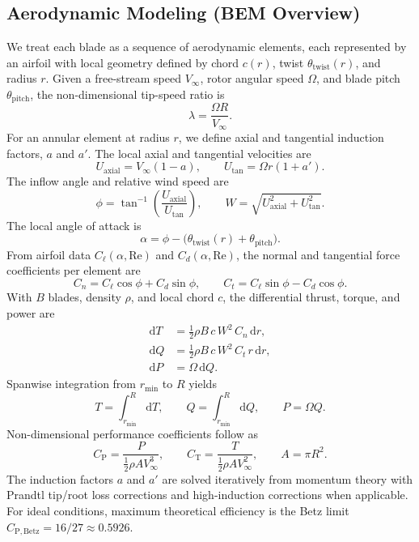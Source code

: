 \documentclass[11pt]{article}
\begin{document}
\subsection{Aerodynamic Modeling (BEM Overview)}
We treat each blade as a sequence of aerodynamic elements, each represented by an airfoil with local geometry defined by chord \(c(r)\), twist \(\theta_\mathrm{twist}(r)\), and radius \(r\). Given a free-stream speed \(V_\infty\), rotor angular speed \(\Omega\), and blade pitch \(\theta_\mathrm{pitch}\), the non-dimensional tip-speed ratio is
\begin{equation}
\lambda = \frac{\Omega R}{V_\infty}.
\label{eq:tsr}
\end{equation}
For an annular element at radius \(r\), we define axial and tangential induction factors, \(a\) and \(a'\). The local axial and tangential velocities are
\begin{equation}
U_\mathrm{axial} = V_\infty (1 - a),\qquad U_\mathrm{tan} = \Omega r (1 + a').
\end{equation}
The inflow angle and relative wind speed are
\begin{equation}
\phi = \tan^{-1}\!\left( \frac{U_\mathrm{axial}}{U_\mathrm{tan}} \right),\qquad W = \sqrt{U_\mathrm{axial}^2 + U_\mathrm{tan}^2}.
\end{equation}
The local angle of attack is
\begin{equation}
\alpha = \phi - \big(\theta_\mathrm{twist}(r) + \theta_\mathrm{pitch}\big).
\end{equation}
From airfoil data \(C_\ell(\alpha,\mathrm{Re})\) and \(C_d(\alpha,\mathrm{Re})\), the normal and tangential force coefficients per element are
\begin{equation}
C_n = C_\ell\cos\phi + C_d\sin\phi, \qquad C_t = C_\ell\sin\phi - C_d\cos\phi.
\end{equation}
With \(B\) blades, density \(\rho\), and local chord \(c\), the differential thrust, torque, and power are
\begin{align}
\mathrm{d}T &= \tfrac{1}{2} \rho B\, c\, W^2\, C_n\, \mathrm{d}r, \\
\mathrm{d}Q &= \tfrac{1}{2} \rho B\, c\, W^2\, C_t\, r\, \mathrm{d}r, \\
\mathrm{d}P &= \Omega\, \mathrm{d}Q.
\end{align}
Spanwise integration from \(r_\min\) to \(R\) yields
\begin{equation}
T = \int_{r_\min}^R \mathrm{d}T, \qquad Q = \int_{r_\min}^R \mathrm{d}Q, \qquad P = \Omega Q.
\end{equation}
Non-dimensional performance coefficients follow as
\begin{equation}
C_\mathrm{P} = \frac{P}{\tfrac{1}{2} \rho A V_\infty^3}, \qquad C_\mathrm{T} = \frac{T}{\tfrac{1}{2} \rho A V_\infty^2}, \qquad A = \pi R^2.
\end{equation}
The induction factors \(a\) and \(a'\) are solved iteratively from momentum theory with Prandtl tip/root loss corrections and high-induction corrections when applicable. For ideal conditions, maximum theoretical efficiency is the Betz limit \(C_\mathrm{P,Betz} = 16/27 \approx 0.5926\).
\end{document}
